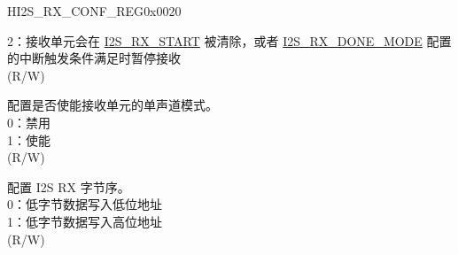 \begin{register}{H}{I2S\_RX\_CONF\_REG}{0x0020}
\begin{regdesc}
\begin{reglist}
2：接收单元会在 \hyperref[fielddesc:I2SRXSTART]{I2S\_RX\_START} 被清除，或者 \hyperref[fielddesc:I2SRXDONEMODE]{I2S\_RX\_DONE\_MODE} 配置的中断触发条件满足时暂停接收\\
(R/W)
\label{fielddesc:I2SRXMONO}\item [I2S\_RX\_MONO] 配置是否使能接收单元的单声道模式。 \\
0：禁用\\
1：使能\\
(R/W)
\label{fielddesc:I2SRXBIGENDIAN}\item [I2S\_RX\_BIG\_ENDIAN] 配置 I2S RX 字节序。 \\
0：低字节数据写入低位地址\\
1：低字节数据写入高位地址\\
(R/W)

\item [见下页...]
\end{reglist}\end{regdesc}
\end{register}
\addtocounter{Regfloat}{-1}
